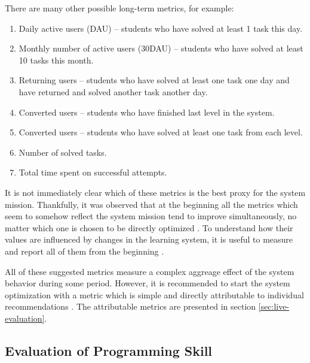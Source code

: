 There are many other possible long-term metrics, for example:
\begin{enumerate}
  \item Daily active users (DAU) -- students who have solved at least 1 task this day.
  \item Monthly number of active users (30DAU) -- students who have solved at least 10 tasks this month.
  \item Returning users -- students who have solved at least one task one day and have returned and solved another task another day.
  \item Converted users -- students who have finished last level in the system.
  \item Converted users -- students who have solved at least one task from each level.
  \item Number of solved tasks.
  \item Total time spent on successful attempts.
\end{enumerate}

It is not immediately clear which of these metrics is the best proxy for the system mission.
Thankfully, it was observed that at the beginning all the metrics which seem to somehow
reflect the system mission tend to improve simultaneously, no matter which one
is chosen to be directly optimized \cite[][Rule \#12]{google-ml-rules}.
To understand how their values are influenced by changes in the learning system,
it is useful to measure and report all of them from the beginning
\cite[][Rule \#2]{google-ml-rules}.

All of these suggested metrics measure a complex aggreage effect of the system
behavior during some period.
However, it is recommended to start the system optimization with a metric which is simple
and directly attributable to individual recommendations \cite[][Rule \#12]{google-ml-rules}.
The attributable metrics are presented in section \ref{sec:live-evaluation}.


\subsection{Evaluation of Programming Skill}

